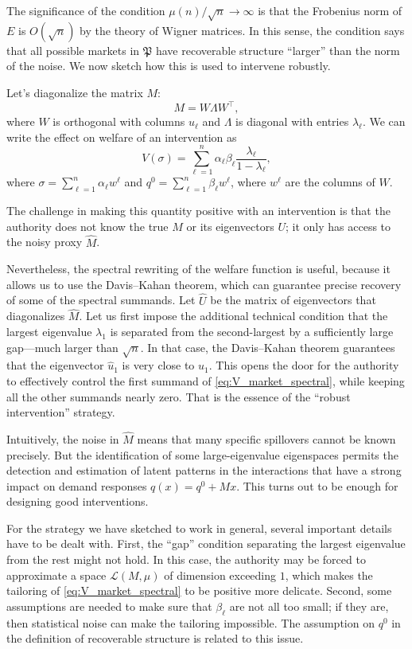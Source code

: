 \documentclass{notices}
\theoremstyle{definition}\newtheorem{problem}{Problem}
\begin{document}
The significance of the condition $\mu(n)/\sqrt{n} \to \infty$ is that the Frobenius norm of $E$ is $O(\sqrt{n})$ by the theory of Wigner matrices. In this sense, the condition says that all possible markets in $\mathfrak{P}$ have recoverable structure ``larger'' than the norm of the noise. We now sketch how this is used to intervene robustly.

Let's diagonalize the matrix \( M \):
\[
M = W \Lambda W^\top,
\]
where \( W \) is orthogonal with columns $u_\ell$ and \( \Lambda \) is diagonal with entries \( \lambda_\ell \). We can write the effect on welfare of an intervention as \begin{equation} \label{eq:V_market_spectral}
V(\sigma) = \sum_{\ell=1}^n \alpha_\ell \beta_\ell \frac{\lambda_\ell}{1 - \lambda_\ell},
\end{equation}
where \( \sigma = \sum_{\ell=1}^n \alpha_\ell w^\ell \) and  \( q^0 = \sum_{\ell=1}^n \beta_\ell w^\ell \), where $w^\ell$ are the columns of $W$. 

The challenge in making this quantity positive with an intervention is that the authority does not know the true $M$ or its eigenvectors $U$; it only has access to the noisy proxy $\widehat{M}$. 

Nevertheless, the spectral rewriting of the welfare function is useful, because it allows us to use the Davis--Kahan theorem, which can guarantee precise recovery of some of the spectral summands. Let $\widehat{U}$ be the matrix of eigenvectors that diagonalizes $\widehat{M}$. Let us first impose the additional technical condition that the largest eigenvalue $\lambda_1$ is separated from the second-largest by a sufficiently large gap---much larger than $\sqrt{n}$.  In that case, the Davis--Kahan theorem guarantees that the eigenvector $\widehat{u}_1$ is very close to $u_1$. This opens the door for the authority to effectively control the first summand of \cref{eq:V_market_spectral}, while keeping all the other summands nearly zero. That is the essence of the ``robust intervention'' strategy. 




Intuitively, the noise in $\widehat{M}$ means that many specific spillovers cannot be known precisely. But the identification of some large-eigenvalue eigenspaces permits the detection and estimation of latent patterns in the interactions that have a strong impact on demand responses $q(x)=q^0+Mx$. This turns out to be enough for designing good interventions.

For the strategy we have sketched to work in general, several important details have to be dealt with. First, the ``gap'' condition separating the largest eigenvalue from the rest might not hold. In this case, the authority may be forced to approximate a space $\mathcal{L}(M, \mu)$ of dimension exceeding $1$, which makes the tailoring of \cref{eq:V_market_spectral} to be positive more delicate. Second, some assumptions are needed to make sure that $\beta_\ell$ are not all too small; if they are, then statistical noise can make the tailoring impossible. The assumption on $q^0$ in the definition of recoverable structure is related to this issue.
\end{document}
